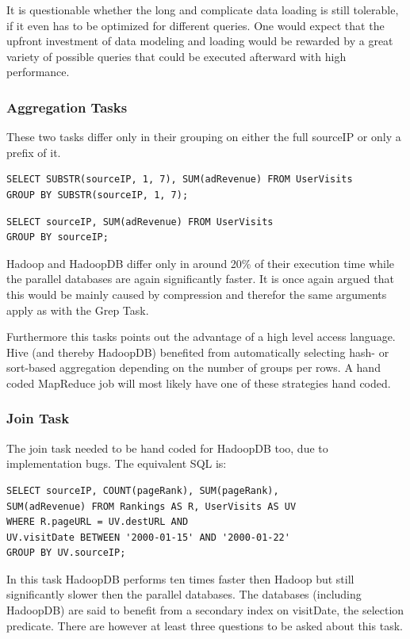 \documentclass[12pt,a4paper]{scrartcl}		%
\begin{document}
It is questionable whether the long and complicate data loading is still tolerable, if it even has to be optimized for different queries. One would expect that the upfront investment of data modeling and loading would be rewarded by a great variety of possible queries that could be executed afterward with high performance.

\subsubsection{Aggregation Tasks}
These two tasks differ only in their grouping on either the full sourceIP or only a prefix of it.

\begin{verbatim}
SELECT SUBSTR(sourceIP, 1, 7), SUM(adRevenue) FROM UserVisits 
GROUP BY SUBSTR(sourceIP, 1, 7);
\end{verbatim}
\begin{verbatim}
SELECT sourceIP, SUM(adRevenue) FROM UserVisits 
GROUP BY sourceIP;
\end{verbatim}

Hadoop and HadoopDB differ only in around 20\% of their execution time while the parallel databases are again significantly faster. It is once again argued that this would be mainly caused by compression and therefor the same arguments apply as with the Grep Task.

Furthermore this tasks points out the advantage of a high level access language. Hive (and thereby HadoopDB) benefited from automatically selecting hash- or sort-based aggregation depending on the number of groups per rows. A hand coded MapReduce job will most likely have one of these strategies hand coded.

\subsubsection{Join Task}
The join task needed to be hand coded for HadoopDB too, due to implementation bugs. The equivalent SQL is:
\begin{verbatim}
SELECT sourceIP, COUNT(pageRank), SUM(pageRank),
SUM(adRevenue) FROM Rankings AS R, UserVisits AS UV
WHERE R.pageURL = UV.destURL AND
UV.visitDate BETWEEN '2000-01-15' AND '2000-01-22'
GROUP BY UV.sourceIP;
\end{verbatim}

In this task HadoopDB performs ten times faster then Hadoop but still significantly slower then the parallel databases. The databases (including HadoopDB) are said to benefit from a secondary index on visitDate, the selection predicate. There are however at least three questions to be asked about this task.
\end{document}
